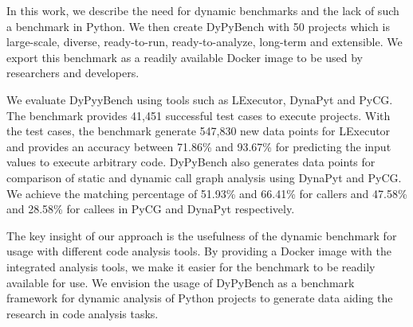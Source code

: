 In this work, we describe the need for dynamic benchmarks and the lack of such a benchmark in Python.
We then create DyPyBench with 50 projects which is large-scale, diverse, ready-to-run, ready-to-analyze, long-term and extensible.
We export this benchmark as a readily available Docker image to be used by researchers and developers. 

We evaluate DyPyyBench using tools such as LExecutor, DynaPyt and PyCG.
The benchmark provides 41,451 successful test cases to execute projects.
With the test cases, the benchmark generate 547,830 new data points for LExecutor and provides an accuracy between 71.86\% and 93.67\% for predicting the input values to execute arbitrary code.
DyPyBench also generates data points for comparison of static and dynamic call graph analysis using DynaPyt and PyCG.
We achieve the matching percentage of 51.93\% and 66.41\% for callers and 47.58\% and 28.58\% for callees in PyCG and DynaPyt respectively.  

The key insight of our approach is the usefulness of the dynamic benchmark for usage with different code analysis tools.
By providing a Docker image with the integrated analysis tools, we make it easier for the benchmark to be readily available for use.
We envision the usage of DyPyBench as a benchmark framework for dynamic analysis of Python projects to generate data aiding the research in code analysis tasks.
